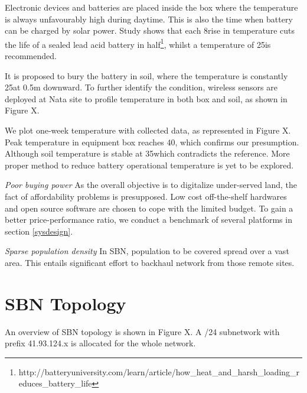 Electronic devices and batteries are placed inside the box where the temperature is always unfavourably high during daytime. This is also the time when battery can be charged by solar power. Study shows that each 8\celsius rise in temperature cuts the life of a sealed lead acid battery in half\footnote{http://batteryuniversity.com/learn/article/how_heat_and_harsh_loading_reduces_battery_life}, whilst a temperature of 25\celsius is recommended.

It is proposed to bury the battery in soil, where the temperature is constantly 25\celsius at 0.5m downward\cite{jager1982soils}. To further identify the condition, wireless sensors are deployed at Nata site to profile temperature in both box and soil, as shown in Figure X.

We plot one-week temperature with collected data, as represented in Figure X. Peak temperature in equipment box reaches 40\celsius, which confirms our presumption. Although soil temperature is stable at 35\celsius which contradicts the reference. More proper method to reduce battery operational temperature is yet to be explored.

\textit{Poor buying power}
As the overall objective is to digitalize under-served land, the fact of affordability problems is presupposed. Low cost off-the-shelf hardwares and open source software are chosen to cope with the limited budget. To gain a better price-performance ratio, we conduct a benchmark of several platforms in section \ref{sysdesign}.

\textit{Sparse population density}
In SBN, population to be covered spread over a vast area. This entails significant effort to backhaul network from those remote sites.

\section{SBN Topology}
An overview of SBN topology is shown in Figure X. A /24 subnetwork with prefix 41.93.124.x is allocated for the whole network. 

